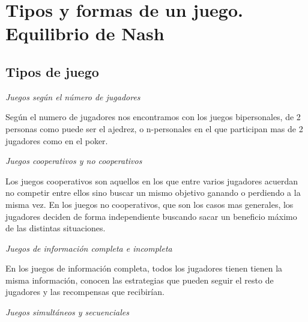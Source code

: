 \documentclass[12pt,a4paper,]{book}
\title{}
\author{Nombre Completo Autor}
\date{18/11/2021}
\def\ifdoblecara{} %
\def\ifprincipal{} %
\let\ifprincipal\undefined %
\numberwithin{dummy}{section}
\theoremstyle{ocrenumbox}
\theoremstyle{blacknumex}
\theoremstyle{blacknumbox}
\theoremstyle{ocrenum}
\theoremstyle{ocrenum}
\begin{document}




\raggedbottom

\ifdefined\ifprincipal
\else
\setlength{\parindent}{1em}
\pagestyle{fancy}
\setcounter{tocdepth}{4}
\tableofcontents

\fi

\ifdefined\ifdoblecara
\fancyhead{}{}
\fancyhead[LE,RO]{\scriptsize\rightmark}
\fancyfoot[LO,RE]{\scriptsize\slshape \leftmark}
\fancyfoot[C]{}
\fancyfoot[LE,RO]{\footnotesize\thepage}
\else
\fancyhead{}{}
\fancyhead[RO]{\scriptsize\rightmark}
\fancyfoot[LO]{\scriptsize\slshape \leftmark}
\fancyfoot[C]{}
\fancyfoot[RO]{\footnotesize\thepage}
\fi

\renewcommand{\headrulewidth}{0.4pt}
\renewcommand{\footrulewidth}{0.4pt}

\hypertarget{Seccion2}{%
\chapter{Tipos y formas de un juego. Equilibrio de
Nash}\label{Seccion2}}

\hypertarget{Seccion21}{%
\section{Tipos de juego}\label{Seccion21}}

\emph{Juegos según el número de jugadores}

Según el numero de jugadores nos encontramos con los juegos
bipersonales, de 2 personas como puede ser el ajedrez, o n-personales en
el que participan mas de 2 jugadores como en el poker.

\emph{Juegos cooperativos y no cooperativos}

Los juegos cooperativos son aquellos en los que entre varios jugadores
acuerdan no competir entre ellos sino buscar un mismo objetivo ganando o
perdiendo a la misma vez. En los juegos no cooperativos, que son los
casos mas generales, los jugadores deciden de forma independiente
buscando sacar un beneficio máximo de las distintas situaciones.

\emph{Juegos de información completa e incompleta}

En los juegos de información completa, todos los jugadores tienen tienen
la misma información, conocen las estrategias que pueden seguir el resto
de jugadores y las recompensas que recibirían.

\emph{Juegos simultáneos y secuenciales}
\end{document}
